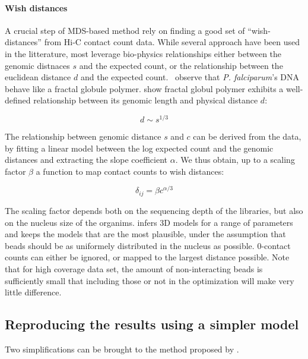 \documentclass[letterpaper,12pt]{article}
\begin{document}
\paragraph{Wish distances}

A crucial step of MDS-based method rely on finding a good set of
``wish-distances'' from Hi-C contact count data. While several approach have
been used in the litterature, most leverage bio-physics relationships either
between the genomic distnaces $s$ and the expected count, or the relationship
between the euclidean distance $d$ and the expected
count. \citet{ay:three-dimensional} observe that {\em P. falciparum}'s DNA
behave like a fractal globule polymer. \citet{grosberg:fractal} show fractal
globul polymer exhibits a well-defined relationship between its genomic length
and physical distance $d$:

$$d\sim s^{1/3}$$

The relationship between genomic distance $s$ and $c$ can be derived from the
data, by fitting a linear model between the log expected count and the genomic
distances and extracting the slope coefficient $\alpha$. We thus obtain, up to
a scaling factor $\beta$ a function to map contact counts to wish distances:

\begin{equation}
\label{eq:count-to-distance}
\delta_{ij} = \beta c^{\alpha/3}
\end{equation}

The scaling factor depends both on the sequencing depth of the libraries, but
also on the nucleus size of the organims. \citet{ay:three-dimensional} infers
3D models for a range of parameters and keeps the models that are the most
plausible, under the assumption that beads should be as uniformely distributed
in the nucleus as possible. 0-contact counts can either be ignored, or mapped
to the largest distance possible. Note that for high coverage data set, the
amount of non-interacting beads is sufficiently small that including those or
not in the optimization will make very little difference.

\subsection{Reproducing the results using a simpler model}

Two simplifications can be brought to the method proposed by
\citet{ay:three-dimensional}. 
\end{document}
